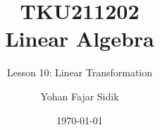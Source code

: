 



\title{TKU211202 \\ Linear Algebra}
\subtitle{\Large Lesson 10: Linear Transformation}
\author{Yohan Fajar Sidik}
\date{\today}
\maketitle

\begin{frame}
	\tableofcontents
\end{frame}





